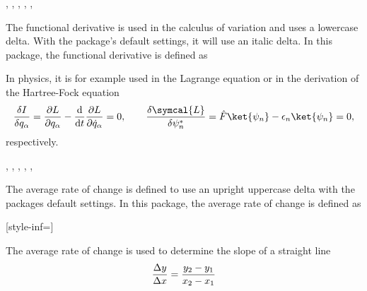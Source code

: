 \documentclass[final,british,10pt]{scrartcl}
\theoremstyle{remark}
\begin{document}
	\begin{function}{\fdv}
		\begin{syntax}
			\sarg, , , \targ{/}, , 
		\end{syntax}
		The functional derivative is used in the calculus of variation and uses a lowercase delta. With the package's default settings, it will use an italic delta. In this package, the functional derivative is defined as
		
		\begin{definition}
			\DeclareOdvVariant{\fdv}{\delta}%
		\end{definition}
		
		\noindent In physics, it is for example used in the Lagrange equation or in the derivation of the Hartree-Fock equation
		\begin{equation*}
		\fdv{I}{q_{\alpha}} = \pdv{L}{q_{\alpha}} - \odv*{ \pdv{L}{ \dot{q}_{\alpha} } } { t } = 0, \qquad \fdv{ \symcal{L} }{ \psi_{n}^* } = \hat{F} \ket{\psi_{n}} - \epsilon_{n} \ket{\psi_{n}} = 0
		,
		\end{equation*}
		respectively.
	\end{function}
	
	\begin{function}{\adv}
		\begin{syntax}
			\sarg, , , \targ{/}, , \earg{\_, point\tsb{1}, \^, point\tsb{2}}
		\end{syntax}
		The average rate of change is defined to use an upright uppercase delta with the packages default settings. In this package, the average rate of change is defined as
		
		\begin{definition}
			\DeclareOdvVariant{\adv}{\Delta}[style-inf=\mathrm]%
			\DeclareOdvVariant{\adv}{\Delta}
		\end{definition}
		
		\noindent The average rate of change is used to determine the slope of a straight line
		\begin{equation*}
		\adv{ y }{ x } = \frac{y_2- y_1}{x_2 - x_1}
		\end{equation*}
	\end{function}
	
\end{document}

